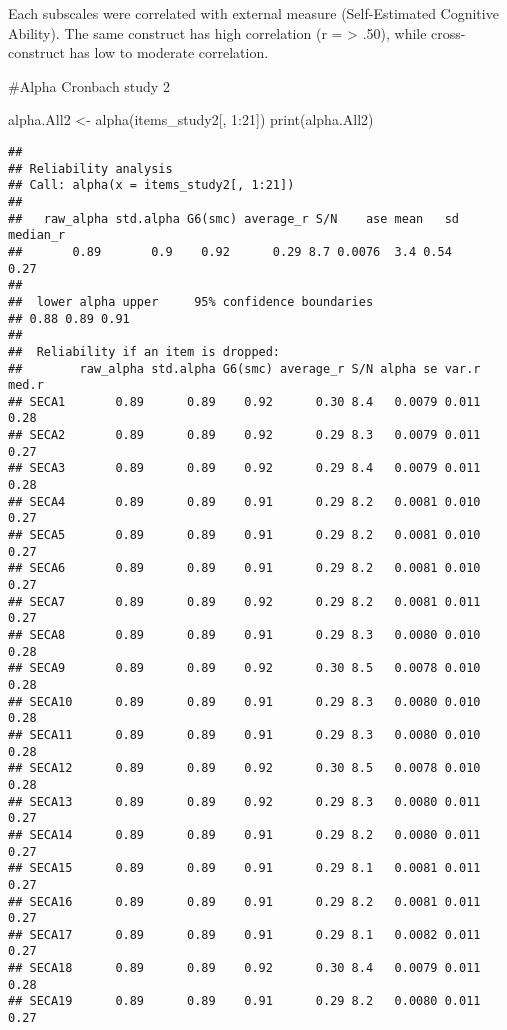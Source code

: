 \documentclass[
]{article}
\newenvironment{Shaded}{\begin{snugshade}}{\end{snugshade}}
\newcommand{\DecValTok}[1]{\textcolor[rgb]{0.00,0.00,0.81}{#1}}
\newcommand{\FunctionTok}[1]{\textcolor[rgb]{0.00,0.00,0.00}{#1}}
\newcommand{\NormalTok}[1]{#1}
\newcommand{\OtherTok}[1]{\textcolor[rgb]{0.56,0.35,0.01}{#1}}
\newcommand{\SpecialCharTok}[1]{\textcolor[rgb]{0.00,0.00,0.00}{#1}}
\begin{document}
Each subscales were correlated with external measure (Self-Estimated
Cognitive Ability). The same construct has high correlation (r =
\textgreater{} .50), while cross-construct has low to moderate
correlation.

\#Alpha Cronbach study 2

\begin{Shaded}
\begin{Highlighting}[]
\NormalTok{alpha.All2 }\OtherTok{\textless{}{-}} \FunctionTok{alpha}\NormalTok{(items\_study2[, }\DecValTok{1}\SpecialCharTok{:}\DecValTok{21}\NormalTok{])}
\FunctionTok{print}\NormalTok{(alpha.All2)}
\end{Highlighting}
\end{Shaded}

\begin{verbatim}
## 
## Reliability analysis   
## Call: alpha(x = items_study2[, 1:21])
## 
##   raw_alpha std.alpha G6(smc) average_r S/N    ase mean   sd median_r
##       0.89       0.9    0.92      0.29 8.7 0.0076  3.4 0.54     0.27
## 
##  lower alpha upper     95% confidence boundaries
## 0.88 0.89 0.91 
## 
##  Reliability if an item is dropped:
##        raw_alpha std.alpha G6(smc) average_r S/N alpha se var.r med.r
## SECA1       0.89      0.89    0.92      0.30 8.4   0.0079 0.011  0.28
## SECA2       0.89      0.89    0.92      0.29 8.3   0.0079 0.011  0.27
## SECA3       0.89      0.89    0.92      0.29 8.4   0.0079 0.011  0.28
## SECA4       0.89      0.89    0.91      0.29 8.2   0.0081 0.010  0.27
## SECA5       0.89      0.89    0.91      0.29 8.2   0.0081 0.010  0.27
## SECA6       0.89      0.89    0.91      0.29 8.2   0.0081 0.010  0.27
## SECA7       0.89      0.89    0.92      0.29 8.2   0.0081 0.011  0.27
## SECA8       0.89      0.89    0.91      0.29 8.3   0.0080 0.010  0.28
## SECA9       0.89      0.89    0.92      0.30 8.5   0.0078 0.010  0.28
## SECA10      0.89      0.89    0.91      0.29 8.3   0.0080 0.010  0.28
## SECA11      0.89      0.89    0.91      0.29 8.3   0.0080 0.010  0.28
## SECA12      0.89      0.89    0.92      0.30 8.5   0.0078 0.010  0.28
## SECA13      0.89      0.89    0.92      0.29 8.3   0.0080 0.011  0.27
## SECA14      0.89      0.89    0.91      0.29 8.2   0.0080 0.011  0.27
## SECA15      0.89      0.89    0.91      0.29 8.1   0.0081 0.011  0.27
## SECA16      0.89      0.89    0.91      0.29 8.2   0.0081 0.011  0.27
## SECA17      0.89      0.89    0.91      0.29 8.1   0.0082 0.011  0.27
## SECA18      0.89      0.89    0.92      0.30 8.4   0.0079 0.011  0.28
## SECA19      0.89      0.89    0.91      0.29 8.2   0.0080 0.011  0.27

\end{verbatim}
\end{document}
